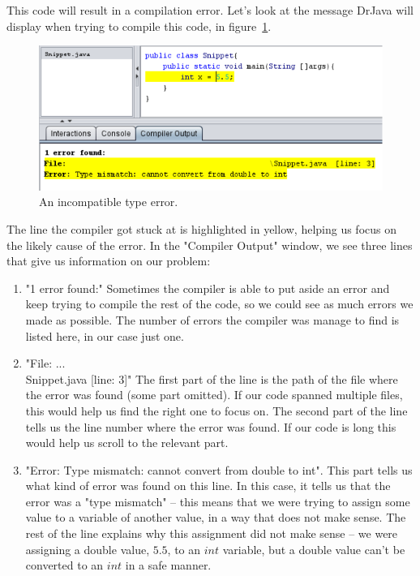 This code will result in a compilation error. Let's look at the message DrJava will display when trying to compile this code, in figure~\ref{fig:type_mismatch}.

\begin{figure}[h!]
\centering
\includegraphics[scale=0.8]{lectures/images/incompatible_types.PNG}
\caption{An incompatible type error.}
\label{fig:type_mismatch}
\end{figure}

The line the compiler got stuck at is highlighted in yellow, helping us focus on the likely cause of the error. In the "Compiler Output" window, we see three lines that give us information on our problem:

\begin{enumerate}
    \item "1 error found:"
    Sometimes the compiler is able to put aside an error and keep trying to compile the rest of the code, so we could see as much errors we made as possible. The number of errors the compiler was manage to find is listed here, in our case just one.
    \item "File: ...\\Snippet.java [line: 3]" 
    The first part of the line is the path of the file where the error was found (some part omitted). If our code spanned multiple files, this would help us find the right one to focus on.
    The second part of the line tells us the line number where the error was found. If our code is long this would help us scroll to the relevant part.
    \item "Error: Type mismatch: cannot convert from double to int".
    This part tells us what kind of error was found on this line. In this case, it tells us that the error was a "type mismatch" -- this means that we were trying to assign some value to a variable of another value, in a way that does not make sense. The rest of the line explains why this assignment did not make sense -- we were assigning a double value, $5.5$, to an $int$ variable, but a double value can't be converted to an $int$ in a safe manner.
\end{enumerate}

